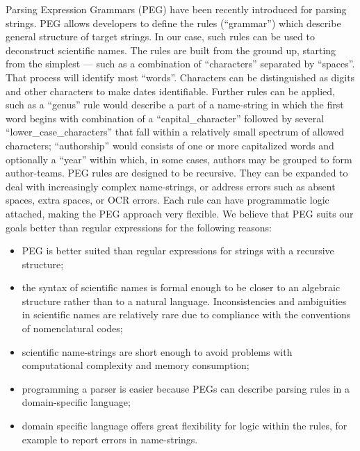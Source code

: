 \documentclass{bmcart}
\begin{document}
Parsing Expression Grammars (PEG) \cite{Ford2004} have been recently introduced for parsing strings. PEG allows developers to define the rules (``grammar'') which describe general structure of target strings. In our case, such rules can be used to deconstruct scientific names. The rules are built from the ground up, starting from the simplest --- such as a combination of ``characters'' separated by ``spaces''. That process will identify most ``words''. Characters can be distinguished as digits and other characters to make dates identifiable.  Further rules can be applied, such as a ``genus'' rule would describe a part of a name-string in which the first word begins with combination of a ``capital\_character'' followed by several ``lower\_case\_characters'' that fall within a relatively small spectrum of allowed characters; ``authorship'' would consists of one or more capitalized words and optionally a ``year'' within which, in some cases, authors may be grouped to form author-teams. PEG rules are designed to be recursive. They can be expanded to deal with increasingly complex name-strings, or address errors such as absent spaces, extra spaces, or OCR errors. Each rule can have programmatic logic attached, making the PEG approach very flexible. We believe that PEG suits our goals better than regular expressions for the following reasons:

\begin{itemize}

  \item PEG is better suited than regular expressions for strings with a recursive structure;

  \item the syntax of scientific names is formal enough to be closer to an algebraic structure rather than to a natural language. Inconsistencies and ambiguities in scientific names are relatively rare due to compliance with the conventions of nomenclatural codes;

  \item scientific name-strings are short enough to avoid problems with computational complexity and memory consumption;

  \item programming a parser is easier because PEGs can describe parsing rules in a domain-specific language;

  \item domain specific language offers great flexibility for logic within the rules, for example to report errors in name-strings.

\end{itemize}
\end{document}
